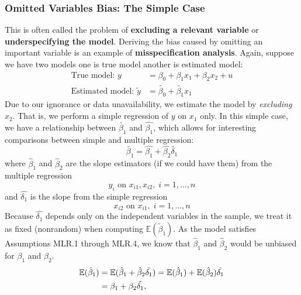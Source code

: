 \documentclass[a4paper, 10pt]{article}
\theoremstyle{definition}	%
\begin{document}
\subsubsection{Omitted Variables Bias: The Simple Case}
This is often called the problem of \textbf{excluding a relevant variable} or \textbf{underspecifying the model}. Deriving the bias caused by omitting an important variable is an example of \textbf{misspecification analysis}. Again, suppose we have two models one is true model another is estimated model:
\begin{align}
    \text{True model:\ } y &= \beta_0 + \beta_1 x_1 +  \beta_2 x_2 + u \label{eq:p.84,3.40} \\
    \text{Estimated model:\ } \tilde{y} &= \tilde{\beta_0} + \tilde{\beta_1} x_1
\end{align} 
Due to our ignorance or data unavailability, we estimate the model by \textit{excluding} $x_2$. That is, we perform a simple regression of $y$ on $x_1$ only. In this simple case, we have a relationship between $\tilde{\beta_1}$ and $\hat{\beta_1}$, which allows for interesting comparisons between simple and multiple regression:
\begin{equation}
    \tilde{\beta_1} = \hat{\beta_1} + \hat{\beta_2}\tilde{\delta_1} \label{eq:p.75,3.23}
\end{equation}
where \(\hat{\beta}_1\) and \(\hat{\beta}_2\) are the slope estimators (if we could have them) from the multiple regression
\begin{equation*}
    y_i \text{ on } x_{i1}, x_{i2}, \; i = 1, \ldots, n 
\end{equation*}
and $\hat{\delta_1}$ is the slope from the simple regression
\begin{equation*}
    x_{i2} \text{ on } x_{i1}, \; i = 1, \ldots, n
\end{equation*}
Because $\hat{\delta_1}$ depends only on the independent variables in the sample, we treat it as fixed (nonrandom) when computing $\mathbb{E}(\tilde{\beta}_1)$. As the model satisfies Assumptions MLR.1 through MLR.4, we know that \(\hat{\beta}_1\) and \(\hat{\beta}_2\) would be unbiased for \(\beta_1\) and \(\beta_2\). 
\begin{align}
    \mathbb{E}(\tilde{\beta}_1) &= \mathbb{E}(\hat{\beta}_1 + \hat{\beta}_2 \tilde{\delta_1}) = \mathbb{E}(\hat{\beta}_1) + \mathbb{E}(\hat{\beta}_2) \tilde{\delta_1} \notag \\ 
    &= \beta_1 + \beta_2 \tilde{\delta_1}, \label{eq:p.85,3.45}
\end{align}
\end{document}
